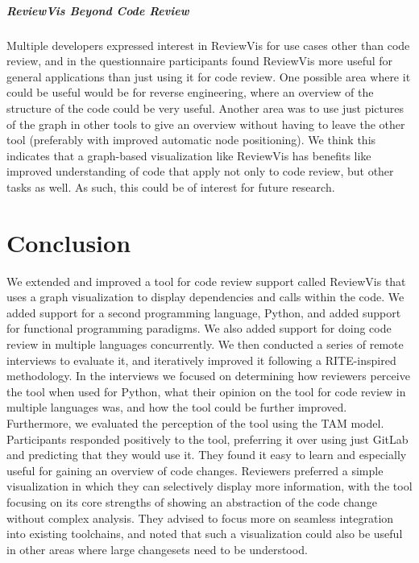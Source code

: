 \documentclass[a4paper,11pt,twoside]{article}
\theoremstyle{definition} %
\begin{document}
\subparagraph{ReviewVis Beyond Code Review}
Multiple developers expressed interest in ReviewVis for use cases other than code review, and in the questionnaire participants found ReviewVis more useful for general applications than just using it for code review. One possible area where it could be useful would be for reverse engineering, where an overview of the structure of the code could be very useful. Another area was to use just pictures of the graph in other tools to give an overview without having to leave the other tool (preferably with improved automatic node positioning). We think this indicates that a graph-based visualization like ReviewVis has benefits like improved understanding of code that apply not only to code review, but other tasks as well. As such, this could be of interest for future research.

\newpage

 
 \section{Conclusion} \label{Sec:Conclusion}
 
 We extended and improved a tool for code review support called ReviewVis that uses a graph visualization to display dependencies and calls within the code. We added support for a second programming language, Python, and added support for functional programming paradigms. We also added support for doing code review in multiple languages concurrently. We then conducted a series of remote interviews to evaluate it, and iteratively improved it following a RITE-inspired methodology. In the interviews we focused on determining how reviewers perceive the tool when used for Python, what their opinion on the tool for code review in multiple languages was, and how the tool could be further improved. Furthermore, we evaluated the perception of the tool using the TAM model. Participants responded positively to the tool, preferring it over using just GitLab and predicting that they would use it. They found it easy to learn and especially useful for gaining an overview of code changes. Reviewers preferred a simple visualization in which they can selectively display more information, with the tool focusing on its core strengths of showing an abstraction of the code change without complex analysis. They advised to focus more on seamless integration into existing toolchains, and noted that such a visualization could also be useful in other areas where large changesets need to be understood. 
\end{document}
